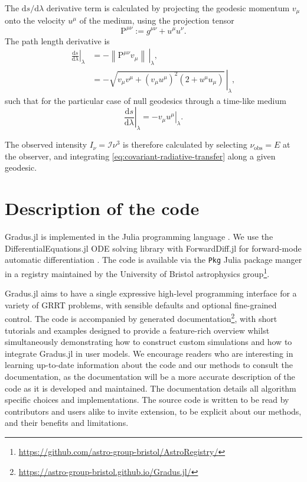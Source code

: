 \documentclass[fleqn,usenatbib]{mnras}
\newcommand{\Gradus}{Gradus.jl\xspace}
\renewcommand{\d}{\text{d}}
\begin{document}
The $\d s / \d \lambda$ derivative term is calculated by projecting the geodesic momentum $v_\mu$ onto the velocity $u^\mu$ of the medium, using the projection tensor
\begin{equation}
    \mathrm{P}^{\mu\nu} := g^{\mu\nu} + u^\mu u^\nu.
\end{equation}
The path length derivative is
\begin{align}
    \left. \frac{\d s}{\d \lambda} \right\rvert_\lambda
    &= - \left. \left\lVert \mathrm{P}^{\mu\nu} v_\mu\right\rVert\, \right\rvert_\lambda,\\
    &= - \left. \sqrt{v_\mu v^\mu + \left(v_\mu u^\mu\right)^2 \left(2 + u^\mu u_\mu\right)} \, \right\rvert_\lambda,
\end{align}
such that for the particular case of null geodesics through a time-like medium
\begin{equation}
    \left. \frac{\d s}{\d \lambda} \right\rvert_\lambda = - \left. v_\mu u^\mu \right\rvert_\lambda.
\end{equation}

The observed intensity $I_\nu = \mathcal{I} \nu^3$ is therefore calculated by selecting $\nu_\text{obs} = E$ at the observer, and integrating \eqref{eq:covariant-radiative-transfer} along a given geodesic.


\section{Description of the code}
\label{sec:description-of-code}

\Gradus is implemented in the Julia programming language
\citep{Bezanson_Julia_A_fresh_2017}. We use the DifferentialEquations.jl ODE
solving library with ForwardDiff.jl for forward-mode automatic differentiation
\citep{RevelsLubinPapamarkou2016}. The code is available via the \texttt{Pkg}
Julia package manger in a registry maintained by the University of
Bristol astrophysics
group\footnote{\url{https://github.com/astro-group-bristol/AstroRegistry/}}.

\Gradus aims to have a single expressive high-level programming interface for a
variety of GRRT problems, with sensible defaults and optional fine-grained
control. The code is accompanied by generated
documentation\footnote{\url{https://astro-group-bristol.github.io/Gradus.jl/}},
with short tutorials and examples designed to provide a feature-rich overview
whilst simultaneously demonstrating how to construct custom simulations and how
to integrate \Gradus in user models. We encourage readers who are interesting in
learning up-to-date information about the code and our methods to consult the
documentation, as the documentation will be a more accurate description of the
code as it is developed and maintained. The documentation details all algorithm
specific choices and implementations. The source code is written to be read by
contributors and users alike to invite extension, to be explicit about our
methods, and their benefits and limitations.
\end{document}
